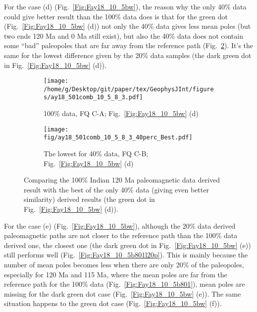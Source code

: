 For the case (d) (Fig.~\ref{Fig:Fay18_10_5bw}), the reason why the only 40\%
data could give better result than the 100\% data does is that for the green
dot (Fig.~\ref{Fig:Fay18_10_5bw} (d)) not only the 40\% data gives less mean
poles (but two ends 120 Ma and 0 Ma still exist), but also the 40\% data does
not contain some ``bad'' paleopoles that are far away from the reference path
(Fig.~\ref{Fig:Fay18_10_5w501l40p}). It's the same for the lowest difference
given by the 20\% data samples (the dark green dot in
Fig.~\ref{Fig:Fay18_10_5bw} (d)).

\begin{figure*}[tbp]
  \captionsetup[subfigure]{labelformat=empty,aboveskip=-6pt,belowskip=-6pt}
  \centering
  \begin{subfigure}[htbp]{.49\textwidth}
    \captionsetup{skip=0pt}
    \centering
    \texttt{[image: /home/g/Desktop/git/paper/tex/GeophysJInt/figures/ay18\_501comb\_10\_5\_8\_3.pdf]}
	\caption{100\% data, FQ C-A; Fig.~\ref{Fig:Fay18_10_5bw}
	(d)}\label{Fig:Fay18_10_5w501}
  \end{subfigure}
  \begin{subfigure}[htbp]{.49\textwidth}
    \captionsetup{skip=0pt}
    \centering
    \texttt{[image: fig/ay18\_501comb\_10\_5\_8\_3\_40perc\_Best.pdf]}  %
    \caption{The lowest for 40\% data, FQ C-B;
	Fig.~\ref{Fig:Fay18_10_5bw} (d)}\label{Fig:Fay18_10_5w501l40p}
  \end{subfigure}
  \caption[Less data, better similarity?]{Comparing the 100\% Indian
  120 Ma paleomagnetic data derived result with the best of the only
  40\% data (giving even better similarity) derived results (the green dot in
  Fig.~\ref{Fig:Fay18_10_5bw} (d)).}\label{Fig:Fay18_10_5w501l40p_vs_100p}
\end{figure*}

For the case (e) (Fig.~\ref{Fig:Fay18_10_5bw}), although the 20\% data derived
paleomagnetic paths are not closer to the reference path than the 100\% data
derived one, the closest one (the dark green dot in Fig.~\ref{Fig:Fay18_10_5bw}
(e)) still performs well (Fig.~\ref{Fig:Fay18_10_5b801l20p}). This is mainly
because the number of mean poles becomes less when there are only 20\% of the
paleopoles, especially for 120 Ma and 115 Ma, where the mean poles are far from
the reference path for the 100\% data (Fig.~\ref{Fig:Fay18_10_5b801}), mean
poles are missing for the dark green dot case (Fig.~\ref{Fig:Fay18_10_5bw} (e)).
The same situation happens to the green dot case (Fig.~\ref{Fig:Fay18_10_5bw}
(f)).

